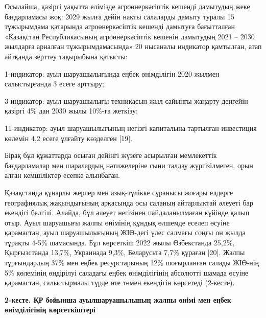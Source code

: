{{Осылайша, қазіргі уақытта елімізде агроөнеркәсіптік кешенді дамытудың
жеке бағдарламасы жоқ: 2029 жылға дейін нақты салаларды дамыту туралы 15
тұжырымдама қатарында агроөнеркәсіптік кешенді дамытуға бағытталған
«Қазақстан Республикасының агроөнеркәсіптік кешенін дамытудың 2021 --
2030 жылдарға арналған тұжырымдамасында» 20 нысаналы индикатор
қамтылған, атап айтқанда зерттеу тақырыбына қатысты:

1-индикатор: ауыл шаруашылығында еңбек өнімділігін 2020 жылмен
салыстырғанда 3 есеге арттыру;

3-индикатор: ауыл шаруашылығы техникасын жыл сайынғы жаңарту деңгейін
қазіргі 4\% дан 2030 жылы 10\%-ға жеткізу;

11-индикатор: ауыл шаруашылығының негізгі капиталына тартылған
инвестиция көлемін 4,2 есеге ұлғайту көзделген {[}19{]}.

Бірақ бұл құжаттарда осыған дейінгі жүзеге асырылған мемлекеттік
бағдарламалар мен шаралардың нәтижелеріне сыни талдау жүргізілмеген,
орын алған кемшіліктер есепке алынбаған.

Қазақстанда құнарлы жерлер мен азық-түлікке сұранысы жоғары елдерге
географиялық жақындығының арқасында осы саланың айтарлықтай әлеуеті бар
екендігі белгілі. Алайда, бұл әлеует негізінен пайдаланылмаған күйінде
қалып отыр. Ауыл шаруашығы жалпы өнімінің құндық өлшемде еселеп өсуіне
қарамастан, ауыл шаруашылығының ЖІӨ-дегі үлес салмағы соңғы он жылда
тұрақты 4-5\% шамасында. Бұл көрсеткіш 2022 жылы Өзбекстанда 25,2\%,
Қырғызстанда 13,7\%, Украинада 9,3\%, Беларусьта 7,7\% құраған {[}20{]}.
Жалпы тұрғындардың 37\% мен еңбек ресурстарының 12\% шоғырланған салады
ЖІӨ-нің 5\% көлемінің өндірілуі саладағы еңбек өнімділігінің абсолютті
шамада өсуіне қарамастан, салыстырмалы түрде өте төмен екендігін
көрсетеді (2-кесте).

{\bfseries 2-кесте. ҚР бойынша ауылшаруашылының жалпы өнімі мен еңбек
өнімділігінің көрсеткіштері}

}}
